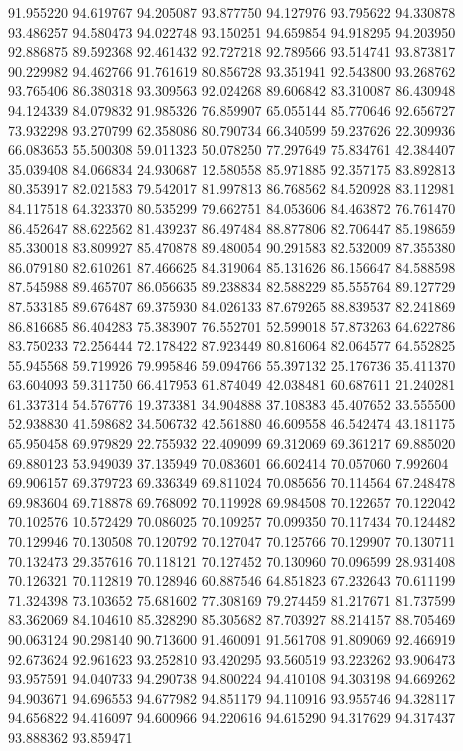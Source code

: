 91.955220
94.619767
94.205087
93.877750
94.127976
93.795622
94.330878
93.486257
94.580473
94.022748
93.150251
94.659854
94.918295
94.203950
92.886875
89.592368
92.461432
92.727218
92.789566
93.514741
93.873817
90.229982
94.462766
91.761619
80.856728
93.351941
92.543800
93.268762
93.765406
86.380318
93.309563
92.024268
89.606842
83.310087
86.430948
94.124339
84.079832
91.985326
76.859907
65.055144
85.770646
92.656727
73.932298
93.270799
62.358086
80.790734
66.340599
59.237626
22.309936
66.083653
55.500308
59.011323
50.078250
77.297649
75.834761
42.384407
35.039408
84.066834
24.930687
12.580558
85.971885
92.357175
83.892813
80.353917
82.021583
79.542017
81.997813
86.768562
84.520928
83.112981
84.117518
64.323370
80.535299
79.662751
84.053606
84.463872
76.761470
86.452647
88.622562
81.439237
86.497484
88.877806
82.706447
85.198659
85.330018
83.809927
85.470878
89.480054
90.291583
82.532009
87.355380
86.079180
82.610261
87.466625
84.319064
85.131626
86.156647
84.588598
87.545988
89.465707
86.056635
89.238834
82.588229
85.555764
89.127729
87.533185
89.676487
69.375930
84.026133
87.679265
88.839537
82.241869
86.816685
86.404283
75.383907
76.552701
52.599018
57.873263
64.622786
83.750233
72.256444
72.178422
87.923449
80.816064
82.064577
64.552825
55.945568
59.719926
79.995846
59.094766
55.397132
25.176736
35.411370
63.604093
59.311750
66.417953
61.874049
42.038481
60.687611
21.240281
61.337314
54.576776
19.373381
34.904888
37.108383
45.407652
33.555500
52.938830
41.598682
34.506732
42.561880
46.609558
46.542474
43.181175
65.950458
69.979829
22.755932
22.409099
69.312069
69.361217
69.885020
69.880123
53.949039
37.135949
70.083601
66.602414
70.057060
7.992604
69.906157
69.379723
69.336349
69.811024
70.085656
70.114564
67.248478
69.983604
69.718878
69.768092
70.119928
69.984508
70.122657
70.122042
70.102576
10.572429
70.086025
70.109257
70.099350
70.117434
70.124482
70.129946
70.130508
70.120792
70.127047
70.125766
70.129907
70.130711
70.132473
29.357616
70.118121
70.127452
70.130960
70.096599
28.931408
70.126321
70.112819
70.128946
60.887546
64.851823
67.232643
70.611199
71.324398
73.103652
75.681602
77.308169
79.274459
81.217671
81.737599
83.362069
84.104610
85.328290
85.305682
87.703927
88.214157
88.705469
90.063124
90.298140
90.713600
91.460091
91.561708
91.809069
92.466919
92.673624
92.961623
93.252810
93.420295
93.560519
93.223262
93.906473
93.957591
94.040733
94.290738
94.800224
94.410108
94.303198
94.669262
94.903671
94.696553
94.677982
94.851179
94.110916
93.955746
94.328117
94.656822
94.416097
94.600966
94.220616
94.615290
94.317629
94.317437
93.888362
93.859471
